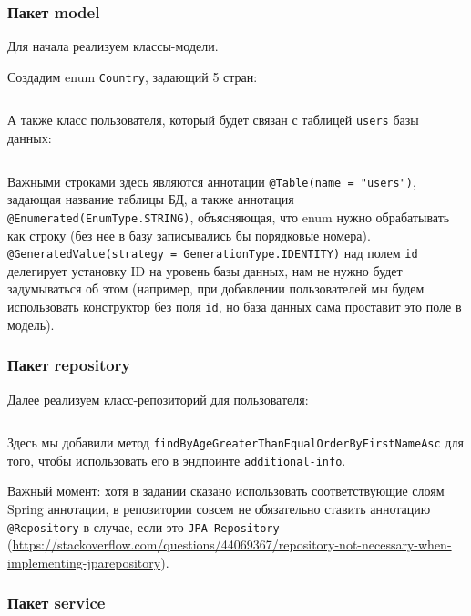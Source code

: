 \documentclass[a4paper, 14pt]{article}
\begin{document}
\subsubsection{Пакет model}

Для начала реализуем классы-модели.

Создадим enum \texttt{Country}, задающий 5 стран:

\normalsize
\inputminted[frame=single]{Java}{../src/main/java/ru/vspochernin/exam/model/Country.java}
\large

А также класс пользователя, который будет связан с таблицей \texttt{users} базы данных:

\normalsize
\inputminted[frame=single]{Java}{../src/main/java/ru/vspochernin/exam/model/User.java}
\large

Важными строками здесь являются аннотации \texttt{@Table(name = "users")}, задающая название таблицы БД, а также аннотация \texttt{@Enumerated(EnumType.STRING)}, объясняющая, что enum нужно обрабатывать как строку (без нее в базу записывались бы порядковые номера). \texttt{@GeneratedValue(strategy = GenerationType.IDENTITY)} над полем \texttt{id} делегирует установку ID на уровень базы данных, нам не нужно будет задумываться об этом (например, при добавлении пользователей мы будем использовать конструктор без поля \texttt{id}, но база данных сама проставит это поле в модель).

\subsubsection{Пакет repository}

Далее реализуем класс-репозиторий для пользователя:

\normalsize
\inputminted[frame=single]{Java}{../src/main/java/ru/vspochernin/exam/repository/UserRepository.java}
\large

Здесь мы добавили метод \texttt{findByAgeGreaterThanEqualOrderByFirstNameAsc} для того, чтобы использовать его в эндпоинте \texttt{additional-info}.

Важный момент: хотя в задании сказано использовать соответствующие слоям Spring аннотации, в репозитории совсем не обязательно ставить аннотацию \texttt{@Repository} в случае, если это \texttt {JPA Repository} (\url{https://stackoverflow.com/questions/44069367/repository-not-necessary-when-implementing-jparepository}).

\subsubsection{Пакет service}
\end{document}

